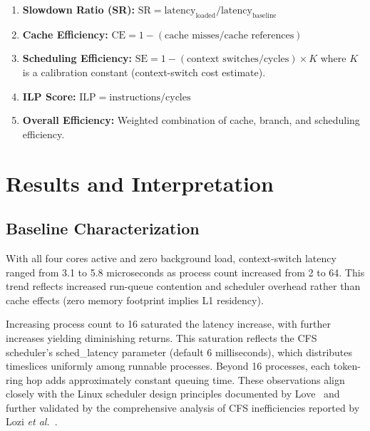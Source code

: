 \documentclass[conference]{IEEEtran}
\begin{document}
\begin{enumerate}
  \item \textbf{Slowdown Ratio (SR):} 
        $\text{SR} = \text{latency}_\text{loaded} / \text{latency}_\text{baseline}$
  \item \textbf{Cache Efficiency:} 
        $\text{CE} = 1 - (\text{cache misses} / \text{cache references})$
  \item \textbf{Scheduling Efficiency:} 
        $\text{SE} = 1 - (\text{context switches} / \text{cycles}) \times K$
        where $K$ is a calibration constant (context-switch cost estimate).
  \item \textbf{ILP Score:} 
        $\text{ILP} = \text{instructions} / \text{cycles}$
  \item \textbf{Overall Efficiency:}
        Weighted combination of cache, branch, and scheduling efficiency.
\end{enumerate}

\section{Results and Interpretation}
\label{sec:results}

\subsection{Baseline Characterization}

With all four cores active and zero background load, context-switch latency
ranged from 3.1 to 5.8 microseconds as process count increased from 2 to 64.
This trend reflects increased run-queue contention and scheduler overhead
rather than cache effects (zero memory footprint implies L1 residency).

Increasing process count to 16 saturated the latency increase, with further
increases yielding diminishing returns. This saturation reflects the CFS
scheduler's sched\_latency parameter (default 6 milliseconds), which
distributes timeslices uniformly among runnable processes. Beyond 16 processes,
each token-ring hop adds approximately constant queuing time. These observations
align closely with the Linux scheduler design principles documented by
Love~\cite{love2010linux} and further validated by the comprehensive analysis
of CFS inefficiencies reported by Lozi \textit{et al.}~\cite{lozi2016linux}.
\end{document}
